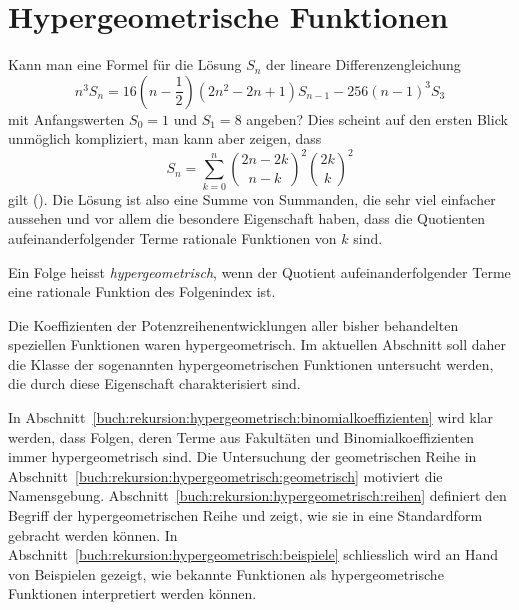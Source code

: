 %
%
%
\section{Hypergeometrische Funktionen
\label{buch:rekursion:section:hypergeometrische-funktion}}
Kann man eine Formel für die Lösung $S_n$ der lineare Differenzengleichung
\[
n^3S_{n}
=
16(n-{\textstyle\frac12})(2n^2-2n+1)S_{n-1}
-256(n-1)^3S_3
\]
mit Anfangswerten $S_0=1$ und $S_1=8$ angeben?
Dies scheint auf den ersten Blick unmöglich kompliziert, man kann aber
zeigen, dass
\begin{equation}
S_n
=
\sum_{k=0}^n 
\binom{2n-2k}{n-k}^2 \binom{2k}{k}^2
\label{buch:rekursion:hypergeometrisch:eqn:Sn}
\end{equation}
gilt (\cite[p.~xi]{buch:ab}).
Die Lösung ist also eine Summe von Summanden, die sehr viel einfacher
aussehen und vor allem die besondere Eigenschaft haben, dass die
Quotienten aufeinanderfolgender Terme rationale Funktionen von $k$
sind.


\begin{definition}
Ein Folge heisst {\em hypergeometrisch}, wenn der Quotient aufeinanderfolgender
%
%
Terme eine rationale Funktion des Folgenindex ist.
\end{definition}

Die Koeffizienten der Potenzreihenentwicklungen aller bisher behandelten
speziellen Funktionen waren hypergeometrisch.
Im aktuellen Abschnitt soll daher die Klasse der sogenannten
hypergeometrischen Funktionen untersucht werden, die durch diese
Eigenschaft charakterisiert sind.

In Abschnitt~\ref{buch:rekursion:hypergeometrisch:binomialkoeffizienten}
wird klar werden, dass Folgen, deren Terme aus Fakultäten und
Binomialkoeffizienten immer hypergeometrisch sind.
%
Die Untersuchung der geometrischen Reihe in
Abschnitt~\ref{buch:rekursion:hypergeometrisch:geometrisch}
%
%
motiviert die Namensgebung.
Abschnitt~\ref{buch:rekursion:hypergeometrisch:reihen}
definiert den Begriff der hypergeometrischen Reihe und zeigt, 
wie sie in eine Standardform gebracht werden können.
In Abschnitt~\ref{buch:rekursion:hypergeometrisch:beispiele}
schliesslich wird an Hand von Beispielen gezeigt, wie bekannte
Funktionen als hypergeometrische Funktionen interpretiert werden können.

